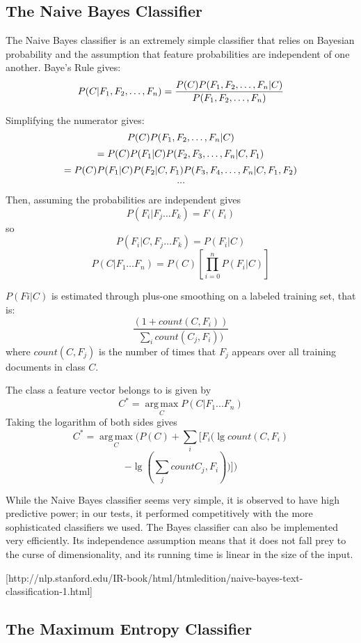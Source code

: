 \documentclass[10pt,twocolumn,letterpaper]{article}
\begin{document}
\subsection{The Naive Bayes Classifier}
The Naive Bayes classifier is an extremely simple classifier that relies on Bayesian probability and the assumption that feature probabilities are independent of one another.
Baye's Rule gives:
$$
P(C | F_1, F_2, \ldots, F_n)
= \frac{P(C)P(F_1, F_2, \ldots, F_n | C)}{P(F_1, F_2, \ldots, F_n)} \\
$$

Simplifying the numerator gives:
$$P(C)P(F_1, F_2, \ldots, F_n | C)\\$$
$$= P(C)P(F_1 | C)P( F_2, F_3, \ldots, F_n| C, F_1) \\$$
$$= P(C)P(F_1 | C)P(F_2 | C, F_1)P(F_3, F_4, \ldots, F_n | C, F_1, F_2) \\$$
$$\ldots$$

Then, assuming the probabilities are independent gives
$$P(F_i | F_j\ldots F_k) = F(F_i)$$
so 
$$P(F_i | C, F_j\ldots F_k) = P(F_i | C)$$
$$P(C | F_1\ldots F_n) = P(C) [\prod_{i=0}^n P(F_i | C) ]$$

$P(Fi | C)$ is estimated through plus-one smoothing on a labeled training set, that is:
$$\frac{(1+count(C, F_i))}{\sum_i count(C_j, F_i))}$$
where $count(C, F_j)$ is the number of times that $F_j$ appears over all training documents in class $C$.

The class a feature vector belongs to is given by
$$C^* = \operatorname*{arg\,max}_C P(C | F_1...F_n)$$
Taking the logarithm of both sides gives
$$C^* = \operatorname*{arg\,max}_C (P(C) + \sum_i [F_i (\lg count (C, F_i)$$ 
$$ - \lg (\sum_j count C_j, F_i))])$$

While the Naive Bayes classifier seems very simple, it is observed to have high predictive power; in our tests, it performed competitively with the more sophisticated classifiers we used. The Bayes classifier can also be implemented very efficiently. Its independence assumption means that it does not fall prey to the curse of dimensionality, and its running time is linear in the size of the input.

[http://nlp.stanford.edu/IR-book/html/htmledition/naive-bayes-text-classification-1.html]

\subsection{The Maximum Entropy Classifier}
\end{document}

